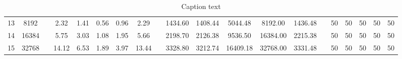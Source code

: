 \begin{table}[!t]
\begin{center}
\begin{tabular}{@{}cccccccccccccccccccc@{}}
13 &    8192 & & 2.32 & 1.41 & 0.56 & 0.96 & 2.29 && 1434.60 & 1408.44 & 5044.48 & 8192.00 & 1436.48 && 50 & 50 & 50 & 50 & 50 \\ 
14 &   16384 & & 5.75 & 3.03 & 1.08 & 1.95 & 5.66 && 2198.70 & 2126.38 & 9536.50 & 16384.00 & 2215.38 && 50 & 50 & 50 & 50 & 50 \\ 
15 &   32768 & & 14.12 & 6.53 & 1.89 & 3.97 & 13.44 && 3328.80 & 3212.74 & 16409.18 & 32768.00 & 3331.48 && 50 & 50 & 50 & 50 & 50 \\ 
\bottomrule \end{tabular} \caption{Caption text} \label{tab:comparison} \end{center} \end{table}
